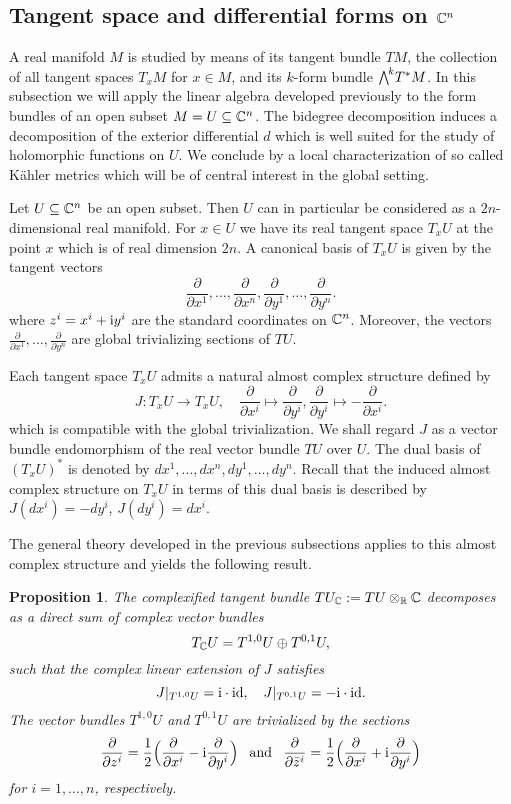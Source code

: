 \documentclass[11pt]{book}
\newtheorem{proposition}[theorem]{Proposition}
\theoremstyle{definition}
\begin{document}
\subsection{Tangent space and differential forms on \texorpdfstring{$\mathbb{C}^n$}{C}}
A real manifold $M$ is studied by means of its tangent bundle $TM$, the collection of all tangent spaces $T_xM$ for $x\in M$, and its $k$-form bundle $\bigw^kT^*M$. In this subsection we will apply the linear algebra developed previously to the form bundles of an open subset $M=U\subseteq\mathbb{C}^n$. The bidegree decomposition induces a decomposition of the exterior differential $d$ which is well suited for the study of holomorphic functions on $U$. We conclude by a local characterization of so called K\"ahler metrics which will be of central interest in the global setting.\par
Let $U\subseteq\mathbb{C}^n$ be an open subset. Then $U$ can in particular be considered as a $2n$-dimensional real manifold. For $x\in U$ we have its real tangent space $T_xU$ at the point $x$ which is of real dimension $2n$. A canonical basis of $T_xU$ is given by the tangent vectors
\[\frac{\partial}{\partial x^1},\dots,\frac{\partial}{\partial x^n},\frac{\partial}{\partial y^1},\dots,\frac{\partial}{\partial y^n}.\]
where $z^i=x^i+\mathrm{i} y^i$ are the standard coordinates on $\mathbb{C}^n$. Moreover, the vectors $\frac{\partial}{\partial x^1},\dots,\frac{\partial}{\partial y^n}$ are global trivializing sections of $TU$.\par
Each tangent space $T_xU$ admits a natural almost complex structure defined by
\[J:T_xU\to T_xU,\quad\frac{\partial}{\partial x^i}\mapsto\frac{\partial}{\partial y^i},\frac{\partial}{\partial y^i}\mapsto-\frac{\partial}{\partial x^i}.\]
which is compatible with the global trivialization. We shall regard $J$ as a vector bundle endomorphism of the real vector bundle $TU$ over $U$. The dual basis of $(T_xU)^*$ is denoted by $dx^1,\dots,dx^n,dy^1,\dots,dy^n$. Recall that the induced almost complex structure on $T_xU$ in terms of this dual basis is described by $J(dx^i)=-dy^i$, $J(dy^i)=dx^i$.\par
The general theory developed in the previous subsections applies to this almost complex structure and yields the following result.
\begin{proposition}
The complexified tangent bundle $TU_{\mathbb{C}}:=TU\otimes_{\mathbb{R}}\mathbb{C}$ decomposes as a direct sum of complex vector bundles
\[T_{\mathbb{C}}U=T^{1,0}U\oplus T^{0,1}U,\]
such that the complex linear extension of $J$ satisfies
\[J|_{T^{1,0}U}=\mathrm{i}\cdot\mathrm{id},\quad J|_{T^{0,1}U}=-\mathrm{i}\cdot\mathrm{id}.\]
The vector bundles $T^{1,0}U$ and $T^{0,1}U$ are trivialized by the sections
\[\frac{\partial}{\partial z^i}=\frac{1}{2}\Big(\frac{\partial}{\partial x^i}-\mathrm{i}\frac{\partial}{\partial y^i}\Big)\hspace{8pt}\text{and}\hspace{8pt}\frac{\partial}{\partial\bar{z}^i}=\frac{1}{2}\Big(\frac{\partial}{\partial x^i}+\mathrm{i}\frac{\partial}{\partial y^i}\Big)\]
for $i=1,\dots,n$, respectively.
\end{proposition}
\end{document}
